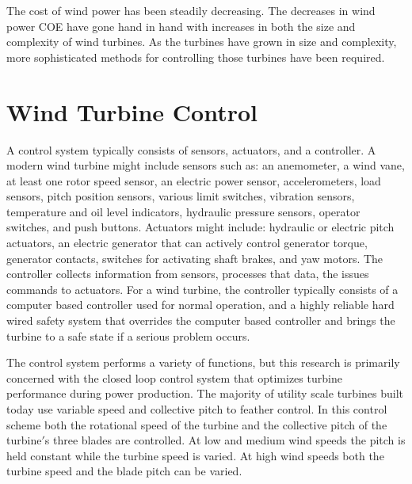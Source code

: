 The cost of wind power has been steadily decreasing.  The decreases in wind power COE have gone hand in hand with increases in both the size and complexity of wind turbines.  As the turbines have grown in size and complexity, more sophisticated methods for controlling those turbines have been required.  



\section{Wind Turbine Control} \label{section1-2} 

A control system typically consists of sensors, actuators, and a controller. A modern wind turbine might include sensors such as: an anemometer, a wind vane, at least one rotor speed sensor, an electric power sensor, accelerometers, load sensors, pitch position sensors, various limit switches, vibration sensors, temperature and oil level indicators, hydraulic pressure sensors, operator switches, and push buttons.  Actuators might include:  hydraulic or electric pitch actuators, an electric generator that can actively control generator torque, generator contacts, switches for activating shaft brakes, and yaw motors.  The controller collects information from sensors, processes that data, the issues commands to actuators. For a wind turbine, the controller typically consists of a computer based controller used for normal operation, and a highly reliable hard wired safety system that overrides the computer based controller and brings the turbine to a safe state if a serious problem occurs.\cite{burton2011}

The control system performs a variety of functions, but this research is primarily concerned with the closed loop control system that optimizes turbine performance during power production. The majority of utility scale turbines built today use variable speed and collective pitch to feather control.  In this control scheme both the rotational speed of the turbine and the collective pitch of the turbine$'$s three blades are controlled. At low and medium wind speeds the pitch is held constant while the turbine speed is varied.  At high wind speeds both the turbine speed and the blade pitch can be varied.

